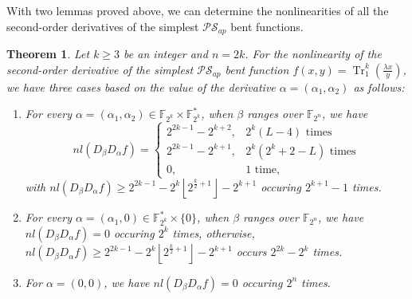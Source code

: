 \documentclass{article}
\newcommand{\F}{\mathbb{F}}
\newcommand{\0}{\textbf{0}}
\newcommand{\1}{\textbf{1}}
\newcommand{\TRACE}{\operatorname{Tr}_1^k}
\theoremstyle{plain}
\newtheorem{theorem}{Theorem}
\begin{document}
    With two lemmas proved above, we can determine the nonlinearities of all the second-order derivatives of the simplest $\mathcal{PS}_{ap}$ bent functions.
    \begin{theorem}\label{thm:nl_DaDbf}
        Let $k\ge 3$ be an integer and $n=2k$.
        For the nonlinearity of the second-order derivative of
        the simplest $\mathcal{PS}_{ap}$ bent function $f(x,y)=\TRACE\left(\frac{\lambda x}{y}\right)$,
        we have three cases based on the value of the derivative $\alpha=(\alpha_1,\alpha_2)$ as follows:
        \begin{enumerate}[label=(\arabic{*})]
            \item For every $\alpha=(\alpha_1,\alpha_2)\in\F_{2^k}\times\F_{2^k}^*$,
            when $\beta$ ranges over $\F_{2^n}$, we have
            \begin{equation}\label{res:nontrivil_nl}
                nl(D_{\beta}D_{\alpha}f)=\begin{cases}
                    2^{2k-1}-2^{k+2},&2^k(L-4)\text{ times}\\
                    2^{2k-1}-2^{k+1},&2^k(2^k+2-L)\text{ times}\\
                    0,&1\text{ time},%
                \end{cases}
            \end{equation}
            with $nl(D_{\beta}D_{\alpha}f)\ge 2^{2k-1}-2^k\left\lfloor 2^{\frac{k}{2}+1}\right\rfloor-2^{k+1}$ occuring $2^{k+1}-1$ times.
            \item For every $\alpha=(\alpha_1,0)\in\F_{2^k}^*\times\{0\}$, when $\beta$ ranges over $\F_{2^n}$,
            we have $nl(D_{\beta}D_{\alpha}f)=0$ occuring $2^k$ times,
            otherwise, $nl(D_{\beta}D_{\alpha}f)\ge 2^{2k-1}-2^k\left\lfloor 2^{\frac{k}{2}+1}\right\rfloor-2^{k+1}$ occurs $2^{2k}-2^k$ times.
            \item For $\alpha=(0,0)$, we have $nl(D_{\beta}D_{\alpha}f) = 0$ occuring $2^n$ times.
        \end{enumerate}
    \end{theorem}
\end{document}
